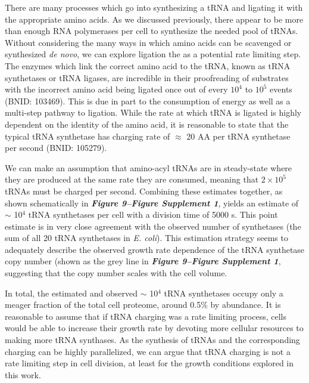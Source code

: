 There are many processes which go into synthesizing a tRNA and ligating it
with the appropriate amino acids. As we discussed previously, there appear to
be more than enough RNA polymerases per cell to synthesize the needed pool of
tRNAs. Without considering the many ways in which amino acids can be
scavenged or synthesized \textit{de novo}, we can explore ligation the as a
potential rate limiting step. The enzymes which link the correct amino acid
to the tRNA, known as tRNA synthetases or tRNA ligases, are incredible in
their proofreading of substrates with the incorrect amino acid being ligated
once out of every $10^4$ to $10^5$ events (BNID: 103469). This is due in part
to the consumption of energy as well as a multi-step pathway to ligation.
While the rate at which tRNA is ligated is highly dependent on the identity
of the amino acid, it is reasonable to state that the typical tRNA synthetase
has charging rate of $\approx$ 20 AA per tRNA synthetase per second (BNID:
105279).

We can make an assumption that amino-acyl tRNAs are in steady-state where
they are produced at the same rate they are consumed, meaning that $2 \times
10^5$ tRNAs must be charged per second. Combining these estimates together,
as shown schematically in \textbf{\textit{Figure 9–Figure Supplement 1}}, yields an estimate of $\sim$ 10$^4$
tRNA synthetases per cell with a division time of 5000 s. This point estimate
is in very close agreement with the observed number of synthetases (the sum
of all 20 tRNA synthetases in \textit{E. coli}). This estimation strategy
seems to adequately describe the observed growth rate dependence of the tRNA
synthetase copy number (shown as the grey line in \textbf{\textit{Figure 9–Figure Supplement 1}}, suggesting
that the copy number scales with the cell volume.

In total, the estimated and observed $\sim$ 10$^4$ tRNA synthetases occupy
only a meager fraction of the total cell proteome, around 0.5\% by abundance.
It is reasonable to assume that if tRNA charging was a rate limiting process,
cells would be able to increase their growth rate by devoting more cellular
resources to making more tRNA synthases. As the synthesis of tRNAs and the
corresponding charging can be highly parallelized, we can argue that tRNA
charging is not a rate limiting step in cell division, at least for the
growth conditions explored in this work.
